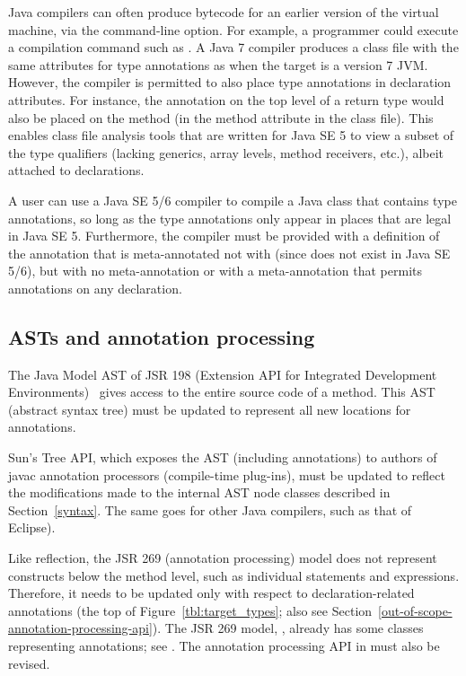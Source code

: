 \documentclass[10pt]{article}
\begin{document}
Java compilers can often produce bytecode for an earlier version of the
virtual machine, via the  command-line option.  For example,
a programmer could execute a compilation command such as .  A Java 7 compiler produces a class file
with the same attributes for type annotations as when the target is a
version 7 JVM\@.  However, the compiler is permitted to also place type
annotations in declaration attributes.  For instance, the annotation on the
top level of a return type would also be placed on the method (in the
method attribute in the class file).  This enables class file analysis
tools that are written for Java SE 5 to view a subset of the type
qualifiers (lacking generics, array levels, method receivers, etc.), albeit
attached to declarations.

A user can use a Java SE 5/6 compiler to compile a Java class that contains
type annotations, so long as the type annotations only appear in places
that are legal in Java SE 5.  Furthermore, the compiler must be provided
with a definition of the annotation that is meta-annotated not with
 (since 
does not exist in Java SE 5/6), but with no meta-annotation or with a
meta-annotation that permits annotations on any declaration.


\subsection{ASTs and annotation processing\label{asts-and-annotation-processing}}

The Java Model AST of JSR 198 (Extension API for Integrated Development
Environments)~\cite{JSR198} gives access to the entire source code of a
method.  This AST (abstract syntax tree) must be updated to represent all
new locations for annotations.

Sun's Tree API, which exposes the AST (including annotations) to authors of
javac annotation processors (compile-time plug-ins), must be updated to
reflect the modifications made to the internal AST node classes described in
Section~\ref{syntax}.
The same goes for other Java compilers, such as that of Eclipse).


\label{jsr269-changes}

Like reflection, the JSR 269 (annotation processing) model
does not represent constructs below the
method level, such as individual statements and expressions.  Therefore, it
needs to be updated only with respect to declaration-related annotations
(the top of Figure~\ref{tbl:target_types}; also see Section~\ref{out-of-scope-annotation-processing-api}).
The JSR 269 model, ,
already has some classes representing annotations; see
.
The annotation processing API in  must
also be revised.
\end{document}
